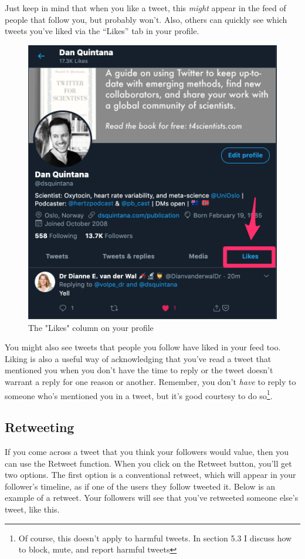 \documentclass[
]{book}
\begin{document}
Just keep in mind that when you like a tweet, this \emph{might} appear in the feed of people that follow you, but probably won't. Also, others can quickly see which tweets you've liked via the ``Likes'' tab in your profile.

\begin{figure}

\includegraphics[width=0.8\linewidth]{images/likes} \hfill{}

\caption{The "Likes" column on your profile}\label{fig:unnamed-chunk-8}
\end{figure}

You might also see tweets that people you follow have liked in your feed too. Liking is also a useful way of acknowledging that you've read a tweet that mentioned you when you don't have the time to reply or the tweet doesn't warrant a reply for one reason or another. Remember, you don't \emph{have} to reply to someone who's mentioned you in a tweet, but it's good courtesy to do so\footnote{Of course, this doesn't apply to harmful tweets. In section 5.3 I discuss how to block, mute, and report harmful tweets}.

\hypertarget{retweeting}{%
\subsection{Retweeting}\label{retweeting}}

If you come across a tweet that you think your followers would value, then you can use the Retweet function. When you click on the Retweet button, you'll get two options. The first option is a conventional retweet, which will appear in your follower's timeline, as if one of the users they follow tweeted it. Below is an example of a retweet. Your followers will see that you've retweeted someone else's tweet, like this.
\end{document}
